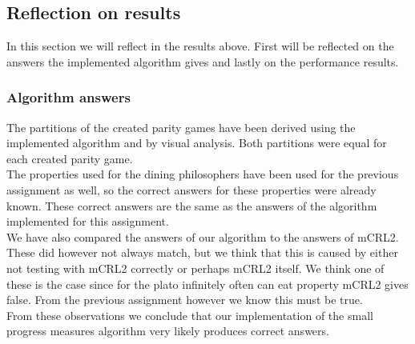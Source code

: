 \documentclass[10pt,a4paper]{article}
\begin{document}
\subsection{Reflection on results}
In this section we will reflect in the results above. First will be reflected on the answers the implemented algorithm gives and lastly on the performance results.

\subsubsection{Algorithm answers}
The partitions of the created parity games have been derived using the implemented algorithm and by visual analysis. Both partitions were equal for each created parity game.\\
The properties used for the dining philosophers have been used for the previous assignment as well, so the correct answers for these properties were already known. These correct answers are the same as the answers of the algorithm implemented for this assignment.\\
We have also compared the answers of our algorithm to the answers of mCRL2. These did however not always match, but we think that this is caused by either not testing with mCRL2 correctly or perhaps mCRL2 itself. We think one of these is the case since for the plato infinitely often can eat property mCRL2 gives false. From the previous assignment however we know this must be true.\\
From these observations we conclude that our implementation of the small progress measures algorithm very likely produces correct answers.
\end{document}
